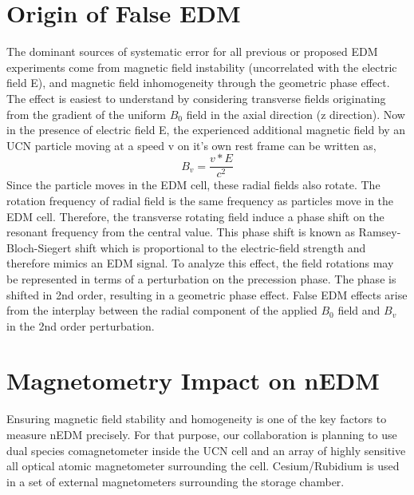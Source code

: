 \section{Origin of False EDM}
The dominant sources of systematic error for all previous or proposed EDM experiments come from magnetic field instability (uncorrelated with the electric field E), and magnetic field inhomogeneity through the geometric phase effect.  The effect is easiest to understand by considering transverse fields originating from the gradient of the uniform $B_0$  field in the axial direction (z direction).  Now in the presence of electric field E, the experienced additional magnetic field by an UCN particle moving at a speed v on it’s own rest frame can be written as,
\begin{equation}
  B_v = \frac{v*E}{c^2}
  \label{equation:phase effect}
\end{equation}
 Since the particle moves in the EDM cell, these radial fields also rotate. The rotation frequency of radial field is the same frequency as particles move in the EDM cell.  Therefore, the transverse rotating field induce a phase shift on the resonant frequency from the central value.  This phase shift is known as Ramsey-Bloch-Siegert shift which is proportional to the electric-field strength and therefore mimics an EDM signal. 
 To analyze this effect, the field rotations may be represented in terms of a perturbation on the precession phase. The phase is shifted in 2nd order, resulting in a geometric phase effect.  False EDM effects arise from the interplay between the radial component of the applied $B_0$  field and $B_v$ in the 2nd order perturbation.

\section{ Magnetometry Impact on nEDM}
Ensuring magnetic field stability and homogeneity is one of the key factors to measure nEDM precisely. For that purpose, our collaboration is planning to use dual species comagnetometer inside the UCN cell and an array of highly sensitive all optical atomic magnetometer surrounding the cell. Cesium/Rubidium is used in a set of external magnetometers surrounding the storage chamber.

